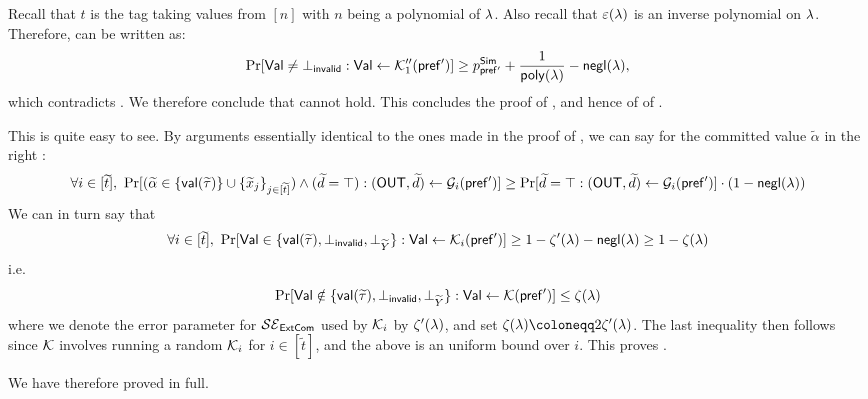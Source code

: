 Recall that $t$ is the tag taking values from $[n]$ with $n$ being a polynomial of $\lambda$. Also recall that $\varepsilon(\lambda)$ is an inverse polynomial on $\lambda$. Therefore,  can be written as:
$$\Pr[\mathsf{Val} \ne \bot_{\mathsf{invalid}}:\mathsf{Val} \gets \mathcal{K}''_1({\mathsf{pref'}})] \ge p^{\mathsf{Sim}}_{\mathsf{pref'}} + \frac{1}{\mathsf{poly}(\lambda)} - \mathsf{negl}(\lambda),$$
which contradicts . We therefore conclude that  cannot hold. This concludes the proof of 
, and hence of  of .


 This is quite easy to see. By arguments essentially identical to the ones made in the proof of , we can say for the committed value $\tilde{\alpha}$ in the right :
$$\forall i \in [\widetilde{t}],~\Pr[(\widetilde{\alpha} \in \{\mathsf{val}(\widetilde{\tau})\} \cup \{\widetilde{x}_j\}_{j \in [\widetilde{t}]}) \wedge (\widetilde{d} = \top): (\mathsf{OUT},\widetilde{d}) \gets \mathcal{G}_i(\mathsf{pref'})] \geq \Pr[\widetilde{d} = \top: (\mathsf{OUT},\widetilde{d}) \gets \mathcal{G}_i(\mathsf{pref'})]\cdot (1-\mathsf{negl}(\lambda))$$
We can in turn say that 
$$\forall i \in [\widetilde{t}],~\Pr[\mathsf{Val} \in \{\mathsf{val}(\widetilde{\tau}),\bot_\mathsf{invalid},\bot_{\widetilde{Y}}\} : \mathsf{Val} \gets \mathcal{K}_i(\mathsf{pref'})] \geq 1 -\zeta'(\lambda)- \mathsf{negl}(\lambda) \geq 1 - \zeta(\lambda)$$ i.e. $$\Pr[\mathsf{Val} \notin \{\mathsf{val}(\widetilde{\tau}),\bot_\mathsf{invalid},\bot_{\widetilde{Y}}\} : \mathsf{Val} \gets \mathcal{K}(\mathsf{pref'})] \leq \zeta(\lambda)$$ 
where we denote the error parameter for $\mathcal{SE}_\mathsf{ExtCom}$ used by $\mathcal{K}_i$ by $\zeta'(\lambda)$, and set $\zeta(\secpar) \coloneqq 2\zeta'(\secpar)$. The last inequality then follows since $\mathcal{K}$ involves running a random $\mathcal{K}_i$ for $i \in [\tilde{t}]$, and the above is an uniform bound over $i$. This proves . 

We have therefore proved  in full. 

\fi



